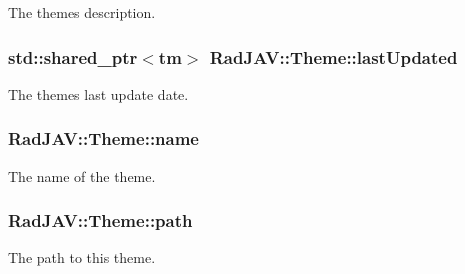 The theme\textquotesingle{}s description. 

\subsubsection[{\texorpdfstring{last\+Updated}{lastUpdated}}]{\setlength{\rightskip}{0pt plus 5cm}std\+::shared\+\_\+ptr$<$tm$>$ Rad\+J\+A\+V\+::\+Theme\+::last\+Updated\hspace{0.3cm}{\ttfamily [protected]}}\hypertarget{class_rad_j_a_v_1_1_theme_a7b0be4a5c8a067898446158325e36615}{}\label{class_rad_j_a_v_1_1_theme_a7b0be4a5c8a067898446158325e36615}


The theme\textquotesingle{}s last update date. 

\subsubsection[{\texorpdfstring{name}{name}}]{ Rad\+J\+A\+V\+::\+Theme\+::name\hspace{0.3cm}{\ttfamily [protected]}}\hypertarget{class_rad_j_a_v_1_1_theme_af6fa94694f2e03b411c05e57794c7898}{}\label{class_rad_j_a_v_1_1_theme_af6fa94694f2e03b411c05e57794c7898}


The name of the theme. 

\subsubsection[{\texorpdfstring{path}{path}}]{ Rad\+J\+A\+V\+::\+Theme\+::path\hspace{0.3cm}{\ttfamily [protected]}}\hypertarget{class_rad_j_a_v_1_1_theme_aa67c5693e612bc33cf9b7b6d7548c4fc}{}\label{class_rad_j_a_v_1_1_theme_aa67c5693e612bc33cf9b7b6d7548c4fc}


The path to this theme. 

